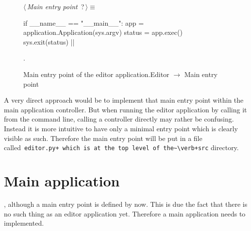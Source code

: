 \documentclass[%
    a4paper,    %
    justified,  %
    nobib,      %
    openany     %
]{tufte-book}
\begin{document}
\begin{figure}[h]
  \begin{flushleft} \small
\begin{minipage}{\linewidth}\label{scrap11}\raggedright\small
{} $\langle\,${\itshape Main entry point}\nobreak\ {\footnotesize {?}}$\,\rangle\equiv$
\vspace{-1ex}
\begin{pythoncode}
if __name__ == "__main__":
    app = application.Application(sys.argv)
    status = app.exec()
    sys.exit(status)
  |\NWsep|
\end{pythoncode}
\vspace{1.5ex}
\footnotesize
\begin{list}{}{\setlength{\itemsep}{-\parsep}\setlength{\itemindent}{-\leftmargin}}
\item {\NWtxtMacroNoRef}.

\item{}
\end{list}
\end{minipage}\vspace{4ex}
\end{flushleft}
\caption{Main entry point of the editor application.\newline{}\newline{}Editor
    $\rightarrow$ Main entry point}
  \label{editor:lst:main}
\end{figure}

 A very direct approach
would be to implement that main entry point within the main application
controller. But when running the editor application by calling it from the
command line, calling a controller directly may rather be confusing. Instead it
is more intuitive to have only a minimal entry point which is clearly visible as
such. Therefore the main entry point will be put in a file
called~\verb=editor.py+ which is at the top level of the~\verb+src= directory.

\section{Main application}
\label{appendix:sec:editor:app}

, although a main entry
point is defined by now. This is due the fact that there is no such thing as an
editor application yet. Therefore a main application needs to implemented.
\end{document}
